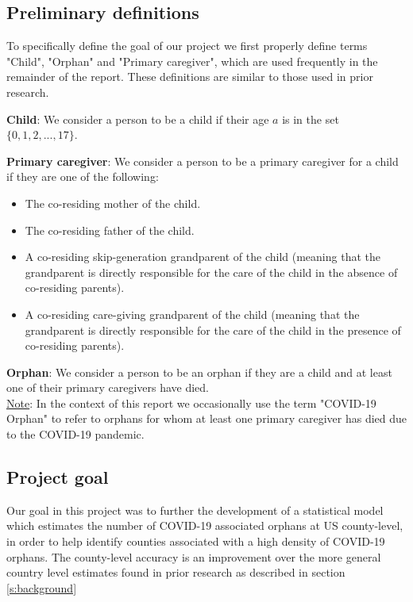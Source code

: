 \documentclass[11pt]{article}
\begin{document}
\subsection{Preliminary definitions}

To specifically define the goal of our project we first properly define terms "Child", "Orphan" and "Primary caregiver", which are used frequently in the remainder of the report. These definitions are similar to those used in prior research.\cite{global_study}

\noindent
\textbf{Child}: We consider a person to be a child if their age $a$ is in the set $\{0, 1, 2, ..., 17\}$.

\noindent
\textbf{Primary caregiver}: We consider a person to be a primary caregiver for a child if they are one of the following: \label{s:primary caregiver}

\begin{itemize}
    \item The co-residing mother of the child.
    \item The co-residing father of the child.
    \item A co-residing skip-generation grandparent of the child (meaning that the grandparent is directly responsible for the care of the child in the absence of co-residing parents).
    \item A co-residing care-giving grandparent of the child (meaning that the grandparent is directly responsible for the care of the child in the presence of co-residing parents).
\end{itemize}
    
\noindent
\textbf{Orphan}: We consider a person to be an orphan if they are a child and at least one of their primary caregivers have died. \\ 

\noindent
\underline{Note}: In the context of this report we occasionally use the term "COVID-19 Orphan" to refer to orphans for whom at least one primary caregiver has died due to the COVID-19 pandemic.

\subsection{Project goal}
Our goal in this project was to further the development of a statistical model which estimates the number of COVID-19 associated orphans at US county-level, in order to help identify counties associated with a high density of COVID-19 orphans. The county-level accuracy is an improvement over the more general country level estimates found in prior research as described in section \ref{s:background}\cite{global_study}
\end{document}
